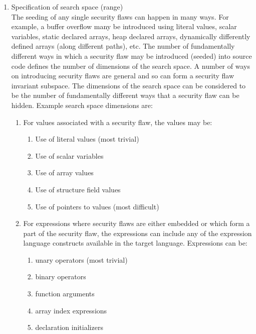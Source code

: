 \begin{enumerate}
   \item Specification of search space (range) \\
         \label{item:SpecificationOfSearchSpace}
         The seeding of any single security flaws can happen in many ways.  For example,
         a buffer overflow many be introduced using literal values, scalar variables,
         static declared arrays, heap declared arrays, dynamically differently
         defined arrays (along different paths), etc.  The number of fundamentally
         different ways in which a security flaw may be introduced (seeded) into source
         code defines the number of dimensions of the search space.  A number of
         ways on introducing security flaws are general and so can form a 
         security flaw invariant subspace. The dimensions of the search space can be
         considered to be the number of fundamentally different ways that a security flaw
         can be hidden.  
         Example search space dimensions are:
         \begin{enumerate}
            \item For values associated with a security flaw, the values may be:
               \begin{enumerate}
                  \item Use of literal values (most trivial)
                  \item Use of scalar variables 
                  \item Use of array values
                  \item Use of structure field values
                  \item Use of pointers to values (most difficult)
               \end{enumerate}

            \item For expressions where security flaws are either embedded or 
                  which form a part of the security flaw, the expressions can 
                  include any of the expression language constructs available
                  in the target language. Expressions can be:
               \begin{enumerate}
                  \item unary operators (most trivial)
                  \item binary operators
                  \item function arguments
                  \item array index expressions
                  \item declaration initializers
               \end{enumerate}


\end{enumerate}
\end{enumerate}
